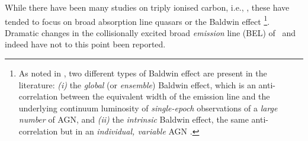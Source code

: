 \documentclass[fleqn,usenatbib]{mnras}
\begin{document}
While there have been many studies on triply ionised carbon, i.e.,
\civ, these have tended to focus on broad absorption line quasars
\citep[e.g., Table 1 of][]{Hemler2019} or the Baldwin effect
\citep{Baldwin1977, Bian2012, Jensen2016,
Hamann2017}\footnote{As noted in \citet{Rakic2017}, two different
types of Baldwin effect are present in the literature: {\it (i)} the {\it
global} (or {\it ensemble}) Baldwin effect, which is an
anti-correlation between the equivalent width of the emission line and the
underlying continuum luminosity of {\it single-epoch} observations of
a {\it large number} of AGN, and {\it (ii)} the {\it intrinsic} Baldwin
effect, the same anti-correlation but in an {\it individual, variable}
AGN \citep{PoggePeterson1992}.}.  Dramatic changes in the
collisionally excited broad {\it emission} line (BEL) of \civ\ and
indeed \ciii have not to this point been reported.
\end{document}
